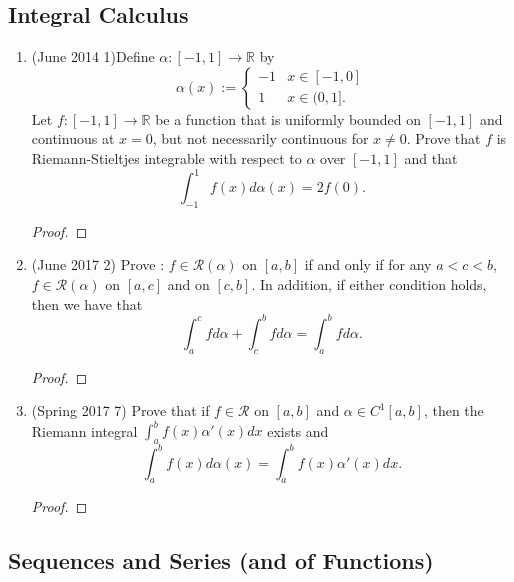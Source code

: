 \documentclass[reqno]{article}
\theoremstyle{remark}
\numberwithin{equation}{section}
\newcommand{\R}{\mathbb{R}}
\begin{document}
\subsection*{Integral Calculus} 

\begin{enumerate}

\item (June 2014 1)Define $\alpha \colon [-1,1] \to \R$ by 
$$
\alpha(x) := \begin{cases} -1 & x \in [-1,0] \\ 1 & x \in (0,1]. \end{cases}
$$
Let $f \colon [-1,1] \to \R$ be a function that is uniformly bounded on $[-1,1]$ and continuous at $x=0$, but not necessarily continuous for $x \neq 0$. Prove that $f$ is Riemann-Stieltjes integrable with respect to $\alpha$ over $[-1,1]$ and that $$\int_{-1}^1 f(x)d\alpha(x) = 2f(0).$$

	\begin{proof}
    
    \end{proof}


\item (June 2017 2) Prove : $f \in \mathcal{R}(\alpha)$ on $[a,b]$ if and only if for any $a <c<b$, $f \in \mathcal{R}(\alpha)$ on $[a,c]$ and on $[c,b]$. In addition, if either condition holds, then we have that 
$$
\int_a^c fd\alpha + \int_c^b fd\alpha = \int_a^b fd\alpha. 
$$

	\begin{proof}
    
    \end{proof}

\item (Spring 2017 7) Prove that if $f \in \mathcal{R}$ on $[a,b]$ and $\alpha \in C^1[a,b]$, then the Riemann integral $\int_a^b f(x)\alpha'(x)dx$ exists and $$\int_a^b f(x) d\alpha(x)= \int_a^b f(x)\alpha'(x)dx.$$

	\begin{proof}
    
    \end{proof}

\end{enumerate} 

\subsection*{Sequences and Series (and of Functions)} 
\end{document}
